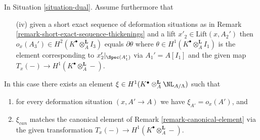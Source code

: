 \begin{lemma}
\label{lemma-dual-obstruction}
In Situation \ref{situation-dual}. Assume furthermore that
\begin{enumerate}
\item[(iv)] given a short exact sequence of deformation situations
as in Remark \ref{remark-short-exact-sequence-thickenings} and
a lift $x'_2 \in \text{Lift}(x, A_2')$ then
$o_x(A_3') \in H^2(K^\bullet \otimes_A^\mathbf{L} I_3)$
equals $\partial\theta$ where
$\theta \in H^1(K^\bullet \otimes_A^\mathbf{L} I_1)$
is the element corresponding to $x'_2|_{\Spec(A_1')}$ via
$A_1' = A[I_1]$ and the given map
$T_x(-) \to H^1(K^\bullet \otimes_A^\mathbf{L} -)$.
\end{enumerate}
In this case there exists an element
$\xi \in H^1(K^\bullet \otimes_A^\mathbf{L} \NL_{A/\Lambda})$
such that
\begin{enumerate}
\item for every deformation situation $(x, A' \to A)$ we have
$\xi_{A'} = o_x(A')$, and
\item $\xi_{can}$ matches the canonical element of
Remark \ref{remark-canonical-element} via the given transformation
$T_x(-) \to H^1(K^\bullet \otimes_A^\mathbf{L} -)$.
\end{enumerate}
\end{lemma}

